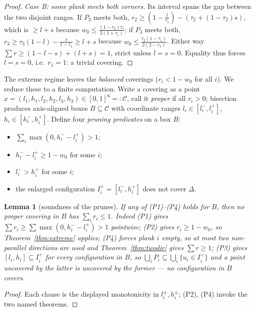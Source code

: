 \documentclass{aims}
\numberwithin{equation}{section}
\theoremstyle{plain}
\newtheorem{lemma}[theorem]{Lemma}
\theoremstyle{definition}
\theoremstyle{remark}
\begin{document}
\begin{proof}
\emph{Case B: some plank meets both corners.} Its interval spans the gap
between the two disjoint ranges. If $P_2$ meets both,
$r_2\ge(1-\tfrac l{\tau_1})-(\tau_2+(1-\tau_2)s)$, which is $\ge l+s$ because
$w_0\le\tfrac{(1-\tau_2)\tau_1}{2(1+\tau_1)}$; if $P_3$ meets both,
$r_3\ge\tau_3(1-l)-\tfrac s{1-\tau_1}\ge l+s$ because
$w_0\le\tfrac{\tau_3(1-\tau_1)}{2(2-\tau_1)}$. Either way
$\sum r\ge(1-l-s)+(l+s)=1$, strict unless $l=s=0$. Equality thus forces
$l=s=0$, i.e.\ $r_1=1$: a trivial covering.
\end{proof}

The extreme regime leaves the \emph{balanced} coverings ($r_i<1-w_0$ for all
$i$). We reduce these to a finite computation. Write a covering as a point
$x=(l_1,h_1,l_2,h_2,l_3,h_3)\in[0,1]^6=:\mathcal C$, call it \emph{proper} if
all $r_i>0$; bisection produces axis-aligned boxes $B\subseteq\mathcal C$ with
coordinate ranges $l_i\in[l_i^-,l_i^+]$, $h_i\in[h_i^-,h_i^+]$. Define four
\emph{pruning predicates} on a box $B$:
\begin{itemize}
\item[(P1)] $\sum_i\max(0,h_i^--l_i^+)>1$;
\item[(P2)] $h_i^--l_i^+\ge1-w_0$ for some $i$;
\item[(P4)] $l_i^->h_i^+$ for some $i$;
\item[(P3)] the enlarged configuration $I_i^+=[l_i^-,h_i^+]$ does not cover
$\Delta$.
\end{itemize}

\begin{lemma}[soundness of the prunes]\label{lem:prunes}
If any of \textup{(P1)--(P4)} holds for $B$, then no proper covering in $B$ has
$\sum_i r_i\le1$. Indeed \textup{(P1)} gives $\sum r_i\ge\sum\max(0,h_i^--
l_i^+)>1$ pointwise; \textup{(P2)} gives $r_i\ge1-w_0$, so
Theorem~\ref{thm:extreme} applies; \textup{(P4)} forces plank $i$ empty, so at
most two non-parallel directions are used and Theorem~\ref{thm:twodir} gives
$\sum r\ge1$; \textup{(P3)} gives $[l_i,h_i]\subseteq I_i^+$ for every
configuration in $B$, so $\bigcup_iP_i\subseteq\bigcup_i\{u_i\in I_i^+\}$ and a
point uncovered by the latter is uncovered by the former --- no configuration
in $B$ covers.
\end{lemma}
\begin{proof}
Each clause is the displayed monotonicity in $l_i^\pm,h_i^\pm$; (P2), (P4)
invoke the two named theorems.
\end{proof}
\end{document}
